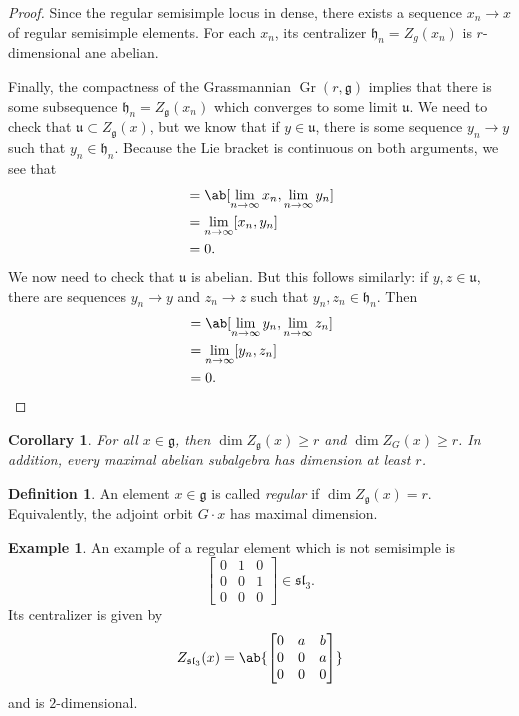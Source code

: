 \documentclass{amsart}
\newtheorem{cor}[thm]{Corollary}
\theoremstyle{definition}
\newtheorem{defn}[thm]{Definition}
\newtheorem{exm}[thm]{Example}
\theoremstyle{remark}
\theoremstyle{plain}
\theoremstyle{definition}
\theoremstyle{remark}
\newcommand{\g}{\mathfrak{g}}
\newcommand{\h}{\mathfrak{h}}
\newcommand{\mf}[1]{\mathfrak{#1}}
\newcommand{\on}[1]{\operatorname{#1}}
\newcommand{\1}{\mathbf{1}}
\newcommand{\2}{\mathbf{2}}
\newcommand{\3}{\mathbf{3}}
\renewcommand{\sl}{\mf{sl}}
\begin{document}
\begin{proof}
    Since the regular semisimple locus in dense, there exists a sequence \(x_n \to x\) of regular semisimple elements. For each \(x_n\), its centralizer \(\h_n = Z_g(x_n)\) is \(r\)-dimensional ane abelian.

    Finally, the compactness of the Grassmannian \(\on{Gr}(r, \g)\) implies that there is some subsequence \(\h_n = Z_{\g}(x_n)\) which converges to some limit \(\mf{u}\). We need to check that \(\mf{u} \subset Z_{\g}(x)\), but we know that if \(y \in \mf{u}\), there is some sequence \(y_n \to y\) such that \(y_n \in \h_n\). Because the Lie bracket is continuous on both arguments, we see that
    \begin{align*}
        [x,y] &= \ab[\lim_{n \to \infty} x_n, \lim_{n \to \infty} y_n] \\
        &= \lim_{n \to \infty} [x_n, y_n] \\
        &= 0.
    \end{align*}
    We now need to check that \(\mf{u}\) is abelian. But this follows similarly: if \(y, z \in \mf{u}\), there are sequences \(y_n \to y\) and \(z_n \to z\) such that \(y_n, z_n \in \h_n\). Then
    \begin{align*}
        [y,z] &= \ab[\lim_{n \to \infty} y_n, \lim_{n \to \infty} z_n] \\
        &= \lim_{n \to \infty} [y_n, z_n] \\
        &= 0. \qedhere
    \end{align*}
\end{proof}

\begin{cor}
    For all \(x \in \g\), then \(\dim Z_{\g}(x) \geq r\) and \(\dim Z_G(x) \geq r\). In addition, every maximal abelian subalgebra has dimension at least \(r\). 
\end{cor}

\begin{defn}
    An element \(x \in \g\) is called \textit{regular} if \(\dim Z_{\g}(x) = r\). Equivalently, the adjoint orbit \(G \cdot x\) has maximal dimension.
\end{defn}

\begin{exm}
    An example of a regular element which is not semisimple is
    \[ \begin{bmatrix}
        0 & 1 & 0 \\
        0 & 0 & 1 \\
        0 & 0 & 0
    \end{bmatrix} \in \sl_3. \]
    Its centralizer is given by
    \[ Z_{\sl_3}(x) = \ab\{ \begin{bmatrix}
        0 & a & b \\
        0 & 0 & a \\
        0 & 0 & 0
    \end{bmatrix} \} \]
    and is \(2\)-dimensional.
\end{exm}
\end{document}
